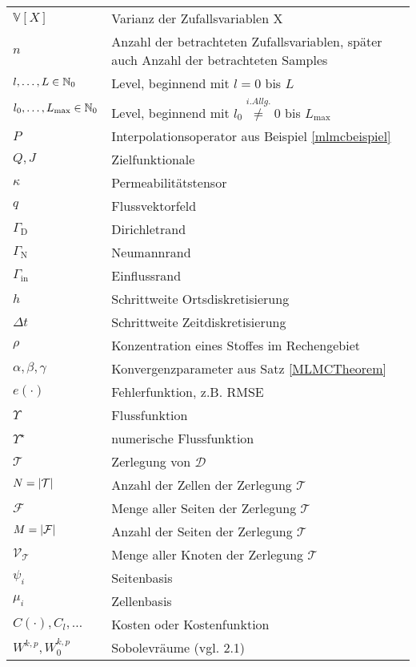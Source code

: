 \begin{longtable}[c]{ p{} p{}}
	$ \mathbb{V}[X] $ & Varianz der Zufallsvariablen X \\
	$ n $ & Anzahl der betrachteten Zufallsvariablen, später auch Anzahl der betrachteten Samples \\
	$ l,\dots,L \in \mathbb{N}_0$ & Level, beginnend mit $ l=0 $ bis $ L $ \\
	$ l_0, \dots , L_{\text{max}} \in \mathbb{N}_0 $ & Level, beginnend mit $ l_0 \stackrel{i.Allg.}{\not =} 0 $ bis $ L_{\text{max}} $  \\
	$ P $ & Interpolationsoperator aus Beispiel \ref{mlmcbeispiel} \\
	$ Q,J $ & Zielfunktionale \\
	$ \kappa $ & Permeabilitätstensor \\
	$ q $ & Flussvektorfeld \\
	$ \Gamma_{\text{D}} $ & Dirichletrand \\
	$ \Gamma_{\text{N}} $ & Neumannrand \\
	$ \Gamma_{\text{in}} $ & Einflussrand \\
	$ h $ & Schrittweite Ortsdiskretisierung \\
	$ \Delta t $ & Schrittweite Zeitdiskretisierung \\
	$ \rho $ & Konzentration eines Stoffes im Rechengebiet \\
	$ \alpha,\beta,\gamma $ & Konvergenzparameter aus Satz \ref{MLMCTheorem} \\
	$ e(\cdot) $ & Fehlerfunktion, z.B. RMSE \\
	$ \Upsilon $ & Flussfunktion \\
	$ \Upsilon^{\star} $ & numerische Flussfunktion \\
	$ \mathcal{T} $ & Zerlegung von $ \mathcal{D} $ \\
	$ N= | \mathcal{T} | $ & Anzahl der Zellen der Zerlegung $ \mathcal{T} $\\
	$ \mathcal{F} $ & Menge aller Seiten der Zerlegung $ \mathcal{T} $ \\
	$ M = | \mathcal{F} | $ & Anzahl der Seiten der Zerlegung $ \mathcal{T} $ \\
	$ \mathcal{V}_{\mathcal{T}} $ & Menge aller Knoten der Zerlegung $ \mathcal{T} $\\
	$ {\psi_i} $ & Seitenbasis \\
	$ {\mu_i} $ & Zellenbasis \\
	$ C(\cdot) , C_l , \dots $ & Kosten oder Kostenfunktion \\
	$ W^{k,p},W_0^{k,p} $ & Sobolevräume (vgl. 2.1) \\

\end{longtable}
